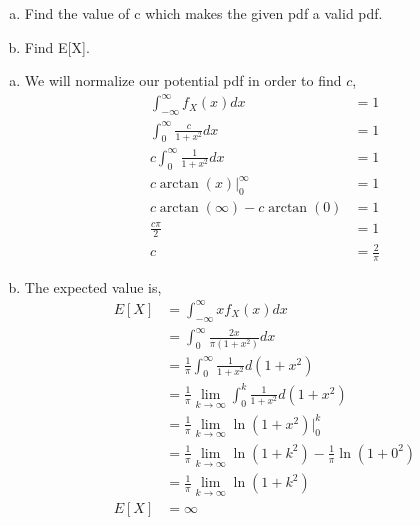 \documentclass[answers]{exam}
\begin{document}
\begin{questions}
{        \begin{enumerate}[(a)]
            \item Find the value of c which makes the given pdf a valid pdf.
            \item Find E[X].
        \end{enumerate}
    }

    \begin{framed}
        \begin{enumerate}[(a)]
            \item We will normalize our potential pdf in order to find $c$,
                  \begin{equation*}
                      \begin{split}
                          \int_{-\infty}^{\infty}f_{X}(x)dx & = 1\\
                          \int_{0}^{\infty}\frac{c}{1+x^2}dx & = 1\\
                          c\int_{0}^{\infty}\frac{1}{1+x^2}dx & = 1\\
                          c\arctan(x)\bigg|_{0}^{\infty} & = 1\\
                          c\arctan(\infty)-c\arctan(0) & = 1\\
                          \frac{c\pi}{2} & = 1\\
                          c & = \frac{2}{\pi}
                      \end{split}
                  \end{equation*}
            \item The expected value is,
                  \begin{equation*}
                      \begin{split}
                          E[X] & = \int_{-\infty}^{\infty}xf_{X}(x)dx\\
                          & = \int_{0}^{\infty}\frac{2x}{\pi(1+x^2)}dx\\
                          & = \frac{1}{\pi}\int_{0}^{\infty}\frac{1}{1+x^2}d(1+x^2)\\
                          & = \frac{1}{\pi}\lim_{k\rightarrow\infty}\int_{0}^{k}\frac{1}{1+x^2}d(1+x^2)\\
                          & = \frac{1}{\pi}\lim_{k\rightarrow\infty}\ln(1+x^2)\bigg|_{0}^{k}\\
                          & = \frac{1}{\pi}\lim_{k\rightarrow\infty}\ln(1+k^2)-\frac{1}{\pi}\ln(1+0^2)\\
                          & = \frac{1}{\pi}\lim_{k\rightarrow\infty}\ln(1+k^2)\\
                          E[X] & = \infty
                      \end{split}
                  \end{equation*}
        \end{enumerate}
    \end{framed}



\end{questions}
\end{document}
